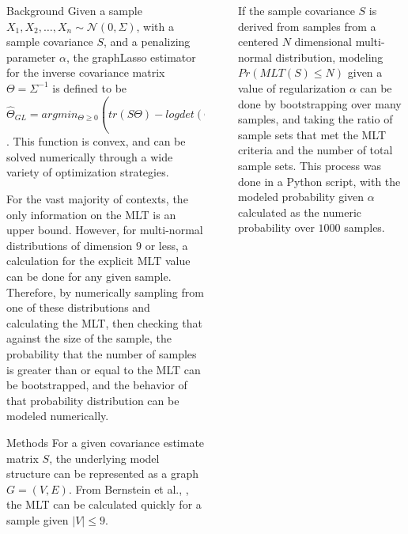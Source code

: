 \documentclass[final]{beamer}
\newlength{\sepwidth}
\newlength{\colwidth}
\newcommand{\separatorcolumn}{\begin{column}{\sepwidth}\end{column}}
\begin{document}
\begin{frame}[t]
\begin{columns}[t]
\begin{column}{\colwidth}
  \begin{block}{Background}
Given a sample $X_1, X_2, \dots, X_n \sim \mathcal{N}(0, \Sigma)$, with a sample covariance $S$, and a penalizing parameter $\alpha$, the graphLasso estimator for the inverse covariance matrix $\Theta = \Sigma^{-1}$ is defined to be \[
\hat{\Theta}_{GL} = argmin_{\Theta \geq 0}(tr(S\Theta) - logdet(\Theta) + \alpha \sum_{j \neq k}|\Theta_{jk}|)
\]\cite{friedman2008sparse}. This function is convex, and can be solved numerically through a wide variety of optimization strategies. 

For the vast majority of contexts, the only information on the MLT is an upper bound. However, for multi-normal distributions of dimension $9$ or less, a calculation for the explicit MLT value can be done for any given sample. Therefore, by numerically sampling from one of these distributions and calculating the MLT, then checking that against the size of the sample, the probability that the number of samples is greater than or equal to the MLT can be bootstrapped, and the behavior of that probability distribution can be modeled numerically. 
  \end{block}

  \begin{block}{Methods}
For a given covariance estimate matrix $S$, the underlying model structure can be represented as a graph $G = (V, E)$. From Bernstein et al., \cite{bernstein2022computing}, the MLT can be calculated quickly for a sample given $|V| \leq 9$. 
  \end{block}


\end{column}

\separatorcolumn

\begin{column}{\colwidth}

If the sample covariance $S$ is derived from samples from a centered $N$ dimensional multi-normal distribution, modeling $Pr(MLT(S) \leq N)$ given a value of regularization $\alpha$ can be done by bootstrapping over many samples, and taking the ratio of sample sets that met the MLT criteria and the number of total sample sets. This process was done in a Python script, with the modeled probability given $\alpha$ calculated as the numeric probability over $1000$ samples.


\end{column}
\end{columns}
\end{frame}
\end{document}
